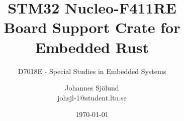 \documentclass[
  aspectratio=169,
]{beamer}
\begin{document}
\title[STM32 Nucleo-F411RE Board Support Crate]{STM32 Nucleo-F411RE \\Board Support Crate for Embedded Rust}
\subtitle[Short Presentation Subtitle]{D7018E - Special Studies in Embedded Systems}
\author[J.\,Sjölund]{Johannes Sjölund \\ johsjl-1@student.ltu.se}
\date{\today}
\subject{STM32 Nucleo-F411RE Board Support Crate for Embedded Rust}

\begin{frame}[plain]
\maketitle
\end{frame}


\end{document}
